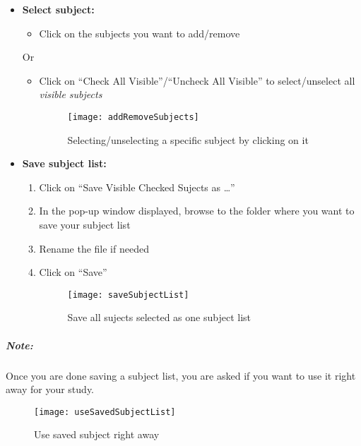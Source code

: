 \documentclass[fadttsterUserGuide_use]{subfiles}
\begin{document}
	\begin{itemize}
		\item \textbf{Select subject:}
		\begin{itemize}
			\item Click on the subjects you want to add/remove
		\end{itemize}
		Or
		\begin{itemize}
			\item Click on ``Check All Visible''/``Uncheck All Visible'' to select/unselect all \emph{visible subjects}
			\begin{figure}[H]
  				\texttt{[image: addRemoveSubjects]}
  				\caption{Selecting/unselecting a specific subject by clicking on it}
    			\label{fig:addRemoveSubjects}
			\end{figure}
		\end{itemize}
	\end{itemize}
	\begin{itemize}
		\item \textbf{Save subject list:}
		\begin{enumerate}
			\item Click on ``Save Visible Checked Sujects as \ldots ''
			\item In the pop-up window displayed, browse to the folder where you want to save your subject list
			\item Rename the file if needed
			\item Click on ``Save''
			\begin{figure}[H]
  				\texttt{[image: saveSubjectList]}
  				\caption{Save all sujects selected as one subject list}
    			\label{fig:saveSubjectList}
			\end{figure}
		\end{enumerate}
	\end{itemize}
	\subparagraph{\textbf{Note:}} Once you are done saving a subject list, you are asked if you want to use it right away for your study.
	\begin{figure}[H]
  		\texttt{[image: useSavedSubjectList]}
  		\caption{Use saved subject right away}
    	\label{fig:useSavedSubjectList}
	\end{figure}	
	\vfill
	\newpage
	
\end{document}
